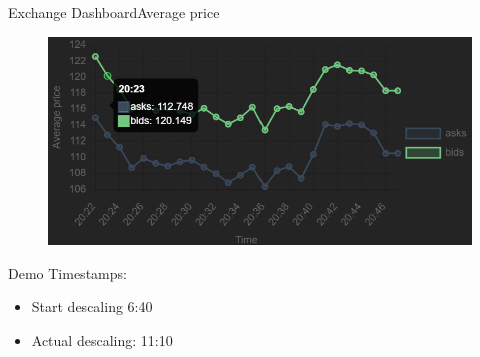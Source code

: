 \documentclass{beamer}
\begin{document}
\begin{frame}{Exchange Dashboard}{Average price}
	\begin{figure}
		\includegraphics[width=\textwidth]{average-price.png}
	\end{figure}
\end{frame}
\begin{frame}{Demo}
	Timestamps:
	\begin{itemize}
		\item Start descaling 6:40
		\item Actual descaling: 11:10
	\end{itemize}
\end{frame}
\end{document}
